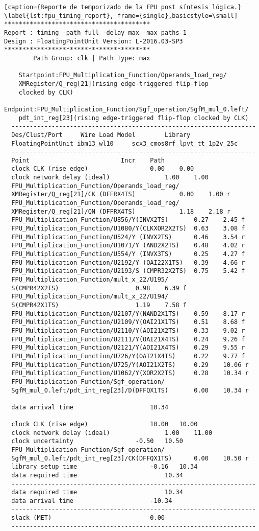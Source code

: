 \begin{lstlisting}[caption={Reporte de temporizado de la FPU post síntesis lógica.} \label{lst:fpu_timing_report}, frame={single},basicstyle=\small]
****************************************
Report : timing -path full -delay max -max_paths 1
Design : FloatingPointUnit Version: L-2016.03-SP3
****************************************
		Path Group: clk | Path Type: max
	
    Startpoint:FPU_Multiplication_Function/Operands_load_reg/
    XMRegister/Q_reg[21](rising edge-triggered flip-flop 
    clocked by CLK)
    Endpoint:FPU_Multiplication_Function/Sgf_operation/SgfM_mul_0.left/
    pdt_int_reg[23](rising edge-triggered flip-flop clocked by CLK)
  -------------------------------------------------------------------
  Des/Clust/Port     Wire Load Model       	Library
  FloatingPointUnit	ibm13_wl10     scx3_cmos8rf_lpvt_tt_1p2v_25c
  -------------------------------------------------------------------
  Point							Incr	Path
  clock CLK (rise edge)					0.00	0.00
  clock network delay (ideal)				1.00	1.00
  FPU_Multiplication_Function/Operands_load_reg/
  XMRegister/Q_reg[21]/CK (DFFRX4TS)			0.00	1.00 r
  FPU_Multiplication_Function/Operands_load_reg/
  XMRegister/Q_reg[21]/QN (DFFRX4TS)			1.18	2.18 r
  FPU_Multiplication_Function/U856/Y(INVX2TS)		0.27	2.45 f
  FPU_Multiplication_Function/U1080/Y(CLKXOR2X2TS)	0.63	3.08 f
  FPU_Multiplication_Function/U524/Y (INVX2TS)		0.46	3.54 r
  FPU_Multiplication_Function/U1071/Y (AND2X2TS)	0.48	4.02 r
  FPU_Multiplication_Function/U554/Y (INVX3TS)		0.25	4.27 f
  FPU_Multiplication_Function/U2192/Y (OAI22X1TS)	0.39	4.66 r
  FPU_Multiplication_Function/U2193/S (CMPR32X2TS)	0.75	5.42 f
  FPU_Multiplication_Function/mult_x_22/U195/
  S(CMPR42X2TS)						0.98	6.39 f
  FPU_Multiplication_Function/mult_x_22/U194/
  S(CMPR42X1TS)						1.19	7.58 f
  FPU_Multiplication_Function/U2107/Y(NAND2X1TS)	0.59	8.17 r
  FPU_Multiplication_Function/U2109/Y(OAI21X1TS)	0.51	8.68 f
  FPU_Multiplication_Function/U2110/Y(AOI21X2TS)	0.33	9.02 r
  FPU_Multiplication_Function/U2111/Y(OAI21X4TS)	0.24	9.26 f
  FPU_Multiplication_Function/U2121/Y(AOI21X4TS)	0.29	9.55 r
  FPU_Multiplication_Function/U726/Y(OAI21X4TS)		0.22	9.77 f
  FPU_Multiplication_Function/U725/Y(AOI21X2TS)		0.29	10.06 r
  FPU_Multiplication_Function/U1062/Y(XOR2X2TS)		0.28	10.34 r
  FPU_Multiplication_Function/Sgf_operation/
  SgfM_mul_0.left/pdt_int_reg[23]/D(DFFQX1TS)		0.00	10.34 r
  
  data arrival time						10.34
  
  clock CLK (rise edge)					10.00	10.00
  clock network delay (ideal)				1.00	11.00
  clock uncertainty					-0.50	10.50
  FPU_Multiplication_Function/Sgf_operation/
  SgfM_mul_0.left/pdt_int_reg[23]/CK(DFFQX1TS)		0.00	10.50 r
  library setup time					-0.16	10.34
  data required time						10.34
  -------------------------------------------------------------------
  data required time						10.34
  data arrival time						-10.34
  -------------------------------------------------------------------
  slack (MET)							0.00
  -------------------------------------------------------------------
  

\end{lstlisting}
